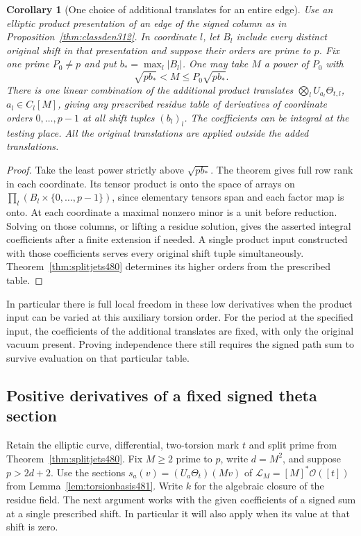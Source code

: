 \documentclass[a4paper,11pt]{article}
\newtheorem{corollary}[proposition]{Corollary}
\theoremstyle{definition}
\theoremstyle{remark}
\numberwithin{equation}{section}
\begin{document}
\begin{corollary}[One choice of additional translates for an entire edge]\leavevmode
\label{cor:productjets481}
Use an elliptic product presentation of an edge of the signed
column as in Proposition~\ref{thm:classden312}. In coordinate
\(l\), let \(B_l\) include every distinct original shift in
that presentation and suppose their orders are prime to \(p\).
Fix one prime \(P_0\ne p\) and put \(b_*=\max_l|B_l|\).
One may take \(M\) a power of \(P_0\) with
\[
                  \sqrt{p b_*}<M\le P_0\sqrt{p b_*}.
\]
There is one linear combination of the additional product
translates \(\bigotimes_lU_{a_l}\Theta_{t,l}\), \(a_l\in C_l[M]\),
giving any prescribed residue table of derivatives of coordinate
orders \(0,\ldots,p-1\) at all shift tuples \((b_l)_l\).
The coefficients can be integral at the testing place. All the
original translations are applied outside the added translations.
\end{corollary}
\begin{proof}
Take the least power strictly above \(\sqrt{p b_*}\).
The theorem gives full row rank in each coordinate. Its tensor
product is onto the space of arrays on
\(\prod_l(B_l\times\{0,\ldots,p-1\})\), since elementary tensors
span and each factor map is onto. At each coordinate a maximal
nonzero minor is a unit before reduction. Solving on those
columns, or lifting a residue solution, gives the asserted integral
coefficients after a finite extension if needed. A single product
input constructed with those coefficients serves every original
shift tuple simultaneously. Theorem~\ref{thm:splitjets480}
determines its higher orders from the prescribed table.
\end{proof}

In particular there is full local freedom in these low derivatives
when the product input can be varied at this auxiliary torsion
order. For the period at the specified input, the coefficients of
the additional translates are fixed, with only the original
vacuum present. Proving independence there still requires the
signed path sum to survive evaluation on that particular table.


\subsection{Positive derivatives of a fixed signed theta section}
\label{sec:positivejets482}

Retain the elliptic curve, differential, two-torsion mark \(t\)
and split prime from Theorem~\ref{thm:splitjets480}. Fix \(M\ge2\)
prime to \(p\), write \(d=M^2\), and suppose \(p>2d+2\).
Use the sections \(s_a(v)=(U_a\Theta_t)(Mv)\) of
\(\mathcal L_M=[M]^*\mathcal O([t])\) from
Lemma~\ref{lem:torsionbasis481}. Write \(k\) for the algebraic
closure of the residue field. The next argument works with the
given coefficients of a signed sum at a single prescribed
shift. In particular it will also apply when its value at that
shift is zero.
\end{document}
